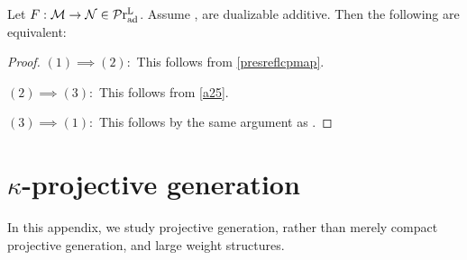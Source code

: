 \documentclass[a4paper,10pt, oneside]{amsart}
\begin{document}
\begin{prop}
	Let $F:\mathcal{M}\to\mathcal{N} \in\mathcal{P}\mathrm{r}_{\mathrm{ad}}^\mathrm{L}$. Assume \mcm, \mcn are dualizable additive. Then the following are equivalent:
\end{prop}

\begin{proof}
	$(1)\implies (2):$	 This follows from \cref{presreflcpmap}.
	
	$(2)\implies (3):$ This follows from \cref{a25}.

	$(3)\implies (1):$ This follows by the same argument as \cite[Corollary 2.43]{ramzi2024dualizable}.
\end{proof}
\section{$\kappa$-projective generation}\label{kappaprojgeneration}
In this appendix, we study projective generation, rather than merely compact projective generation, and  large weight structures.
\end{document}
